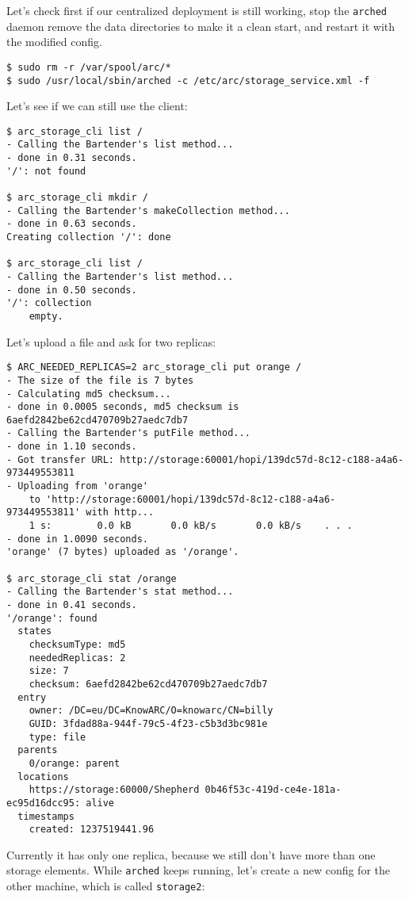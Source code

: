 \documentclass{book}
\begin{document}
Let's check first if our centralized deployment is still working, stop the \verb!arched! daemon remove the data directories to make it a clean start, and restart it with the modified config.

\begin{verbatim}
$ sudo rm -r /var/spool/arc/*
$ sudo /usr/local/sbin/arched -c /etc/arc/storage_service.xml -f    
\end{verbatim}

Let's see if we can still use the client:

\begin{verbatim}
$ arc_storage_cli list /
- Calling the Bartender's list method...
- done in 0.31 seconds.
'/': not found

$ arc_storage_cli mkdir /
- Calling the Bartender's makeCollection method...
- done in 0.63 seconds.
Creating collection '/': done

$ arc_storage_cli list /
- Calling the Bartender's list method...
- done in 0.50 seconds.
'/': collection
    empty.
\end{verbatim}

Let's upload a file and ask for two replicas:

\begin{verbatim}
$ ARC_NEEDED_REPLICAS=2 arc_storage_cli put orange /
- The size of the file is 7 bytes
- Calculating md5 checksum...
- done in 0.0005 seconds, md5 checksum is 6aefd2842be62cd470709b27aedc7db7
- Calling the Bartender's putFile method...
- done in 1.10 seconds.
- Got transfer URL: http://storage:60001/hopi/139dc57d-8c12-c188-a4a6-973449553811
- Uploading from 'orange'
    to 'http://storage:60001/hopi/139dc57d-8c12-c188-a4a6-973449553811' with http...
    1 s:        0.0 kB       0.0 kB/s       0.0 kB/s    . . .       
- done in 1.0090 seconds.
'orange' (7 bytes) uploaded as '/orange'.

$ arc_storage_cli stat /orange
- Calling the Bartender's stat method...
- done in 0.41 seconds.
'/orange': found
  states
    checksumType: md5
    neededReplicas: 2
    size: 7
    checksum: 6aefd2842be62cd470709b27aedc7db7
  entry
    owner: /DC=eu/DC=KnowARC/O=knowarc/CN=billy
    GUID: 3fdad88a-944f-79c5-4f23-c5b3d3bc981e
    type: file
  parents
    0/orange: parent
  locations
    https://storage:60000/Shepherd 0b46f53c-419d-ce4e-181a-ec95d16dcc95: alive
  timestamps
    created: 1237519441.96
\end{verbatim}

Currently it has only one replica, because we still don't have more than one storage elements. While \verb!arched! keeps running, let's create a new config for the other machine, which is called \verb!storage2!:
\end{document}
